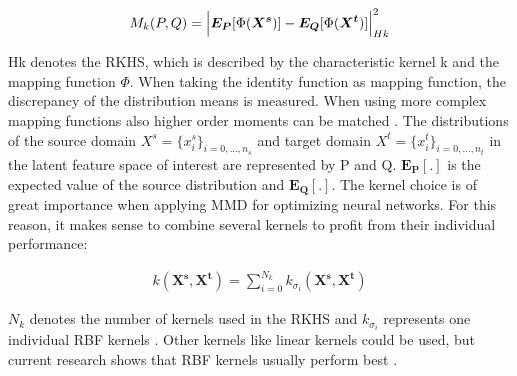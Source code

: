 \begin{align}
    M_{k}(P,Q) = \Bigl|  \boldsymbol{E_{P}}[\Phi(\boldsymbol{X^{s}})] - \boldsymbol{E_{Q}}[\Phi(\boldsymbol{X^{t}})]     \Bigl|^{2}_{Hk}
\end{align}

Hk denotes the RKHS, which is described by the characteristic kernel k and the mapping function $\Phi$. When taking the identity function as mapping function, the discrepancy of the distribution means is measured. When using more complex mapping functions also higher order moments can be matched \cite{Yujia2015}. The distributions of the source domain $X^{s} = \{{x}_{i}^{s}\}_{i=0,...,n_{s}}$ and target domain $X^{t} = \{{x}_{i}^{t}\}_{i=0,...,n_{t}}$ in the latent feature space of interest are represented by P and Q. $\boldsymbol{E_{P}[.]}$ is the expected value of the source distribution and $\boldsymbol{E_{Q}[.]}$. The kernel choice is of great importance when applying MMD for optimizing neural networks. For this reason, it makes sense to combine several kernels to profit from their individual performance:

\begin{align}
    k(\boldsymbol{X^{s}}, \boldsymbol{X^{t}}) = \sum_{i=0}^{N_{k}} k_{\sigma_{i}}(\boldsymbol{X^{s}}, \boldsymbol{X^{t}})
\end{align}

$N_{k}$ denotes the number of kernels used in the RKHS and $k_{\sigma_{i}}$ represents one individual RBF kernels  \cite{li2020}. Other kernels like linear kernels could be used, but current research shows that RBF kernels usually perform best \cite{AZAMFAR2020103932}.
